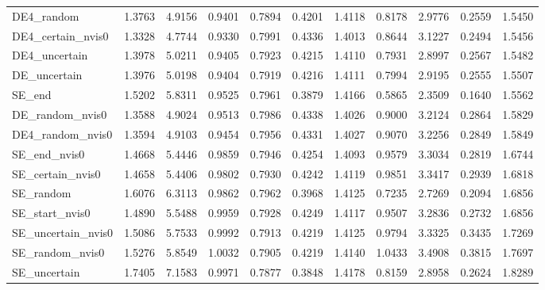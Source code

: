 \begin{tabular}{lrrrrrrrrrr}
DE4_random & 1.3763 & 4.9156 & 0.9401 & 0.7894 & 0.4201 & 1.4118 & 0.8178 & 2.9776 & 0.2559 & 1.5450 \\
DE4_certain_nvis0 & 1.3328 & 4.7744 & 0.9330 & 0.7991 & 0.4336 & 1.4013 & 0.8644 & 3.1227 & 0.2494 & 1.5456 \\
DE4_uncertain & 1.3978 & 5.0211 & 0.9405 & 0.7923 & 0.4215 & 1.4110 & 0.7931 & 2.8997 & 0.2567 & 1.5482 \\
DE_uncertain & 1.3976 & 5.0198 & 0.9404 & 0.7919 & 0.4216 & 1.4111 & 0.7994 & 2.9195 & 0.2555 & 1.5507 \\
SE_end & 1.5202 & 5.8311 & 0.9525 & 0.7961 & 0.3879 & 1.4166 & 0.5865 & 2.3509 & 0.1640 & 1.5562 \\
DE_random_nvis0 & 1.3588 & 4.9024 & 0.9513 & 0.7986 & 0.4338 & 1.4026 & 0.9000 & 3.2124 & 0.2864 & 1.5829 \\
DE4_random_nvis0 & 1.3594 & 4.9103 & 0.9454 & 0.7956 & 0.4331 & 1.4027 & 0.9070 & 3.2256 & 0.2849 & 1.5849 \\
SE_end_nvis0 & 1.4668 & 5.4446 & 0.9859 & 0.7946 & 0.4254 & 1.4093 & 0.9579 & 3.3034 & 0.2819 & 1.6744 \\
SE_certain_nvis0 & 1.4658 & 5.4406 & 0.9802 & 0.7930 & 0.4242 & 1.4119 & 0.9851 & 3.3417 & 0.2939 & 1.6818 \\
SE_random & 1.6076 & 6.3113 & 0.9862 & 0.7962 & 0.3968 & 1.4125 & 0.7235 & 2.7269 & 0.2094 & 1.6856 \\
SE_start_nvis0 & 1.4890 & 5.5488 & 0.9959 & 0.7928 & 0.4249 & 1.4117 & 0.9507 & 3.2836 & 0.2732 & 1.6856 \\
SE_uncertain_nvis0 & 1.5086 & 5.7533 & 0.9992 & 0.7913 & 0.4219 & 1.4125 & 0.9794 & 3.3325 & 0.3435 & 1.7269 \\
SE_random_nvis0 & 1.5276 & 5.8549 & 1.0032 & 0.7905 & 0.4219 & 1.4140 & 1.0433 & 3.4908 & 0.3815 & 1.7697 \\
SE_uncertain & 1.7405 & 7.1583 & 0.9971 & 0.7877 & 0.3848 & 1.4178 & 0.8159 & 2.8958 & 0.2624 & 1.8289 \\
\bottomrule
\end{tabular}
